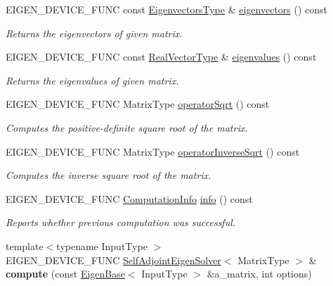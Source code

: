 \begin{DoxyCompactItemize}
E\+I\+G\+E\+N\+\_\+\+D\+E\+V\+I\+C\+E\+\_\+\+F\+U\+NC const \hyperlink{group___core___module}{Eigenvectors\+Type} \& \hyperlink{group___eigenvalues___module_a7b9f7e641fa46ac4c5f2371405c69b2b}{eigenvectors} () const
\begin{DoxyCompactList}\small\item\em Returns the eigenvectors of given matrix. \end{DoxyCompactList}\item 
E\+I\+G\+E\+N\+\_\+\+D\+E\+V\+I\+C\+E\+\_\+\+F\+U\+NC const \hyperlink{group___eigenvalues___module_acd090d5fdfc3cc017a13b6d8daa92287}{Real\+Vector\+Type} \& \hyperlink{group___eigenvalues___module_a8efab27e82aa6aa0ae0c64739238c2e0}{eigenvalues} () const
\begin{DoxyCompactList}\small\item\em Returns the eigenvalues of given matrix. \end{DoxyCompactList}\item 
E\+I\+G\+E\+N\+\_\+\+D\+E\+V\+I\+C\+E\+\_\+\+F\+U\+NC Matrix\+Type \hyperlink{group___eigenvalues___module_a5c5158fd86366081bdabec38112c2c8a}{operator\+Sqrt} () const
\begin{DoxyCompactList}\small\item\em Computes the positive-\/definite square root of the matrix. \end{DoxyCompactList}\item 
E\+I\+G\+E\+N\+\_\+\+D\+E\+V\+I\+C\+E\+\_\+\+F\+U\+NC Matrix\+Type \hyperlink{group___eigenvalues___module_a71fe0aea0b22d176efcea556c5c160f5}{operator\+Inverse\+Sqrt} () const
\begin{DoxyCompactList}\small\item\em Computes the inverse square root of the matrix. \end{DoxyCompactList}\item 
E\+I\+G\+E\+N\+\_\+\+D\+E\+V\+I\+C\+E\+\_\+\+F\+U\+NC \hyperlink{group__enums_ga85fad7b87587764e5cf6b513a9e0ee5e}{Computation\+Info} \hyperlink{group___eigenvalues___module_a56bd59b85a6f6f00ff7bff307ad0e015}{info} () const
\begin{DoxyCompactList}\small\item\em Reports whether previous computation was successful. \end{DoxyCompactList}\item 
\mbox{\label{group___eigenvalues___module_a93d51c96b39de99d9e8ad145c54dff8a}} 
{\footnotesize template$<$typename Input\+Type $>$ }\\E\+I\+G\+E\+N\+\_\+\+D\+E\+V\+I\+C\+E\+\_\+\+F\+U\+NC \hyperlink{group___eigenvalues___module_class_eigen_1_1_self_adjoint_eigen_solver}{Self\+Adjoint\+Eigen\+Solver}$<$ Matrix\+Type $>$ \& {\bfseries compute} (const \hyperlink{group___core___module_struct_eigen_1_1_eigen_base}{Eigen\+Base}$<$ Input\+Type $>$ \&a\+\_\+matrix, int options)
\end{DoxyCompactItemize}
